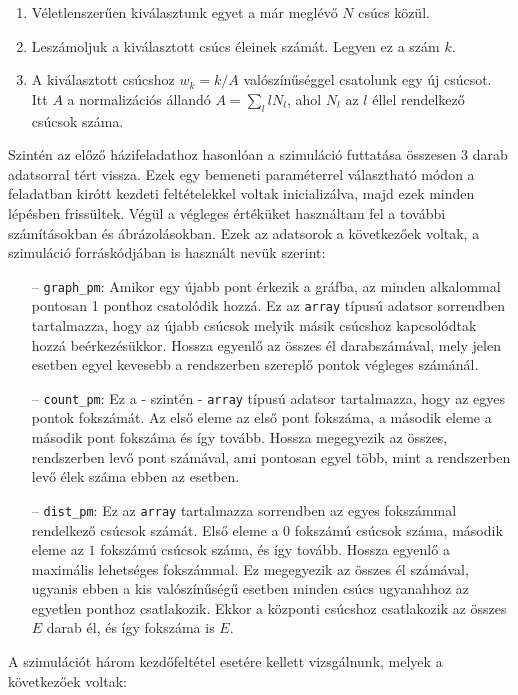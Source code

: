 \begin{enumerate}
    \item Véletlenszerűen kiválasztunk egyet a már meglévő $N$ csúcs közül.
    \item Leszámoljuk a kiválasztott csúcs éleinek számát. Legyen ez a szám $k$.
    \item A kiválasztott csúcshoz $w_{k} = k/A$ valószínűséggel csatolunk egy új csúcsot. Itt $A$ a normalizációs állandó $A = \sum_{l} l N_{l}$, ahol $N_{l}$ az $l$ éllel rendelkező csúcsok száma.
\end{enumerate}
Szintén az előző házifeladathoz hasonlóan a szimuláció futtatása összesen 3 darab adatsorral tért vissza. Ezek egy bemeneti paraméterrel választható módon a feladatban kirótt kezdeti feltételekkel voltak inicializálva, majd ezek minden lépésben frissültek. Végül a végleges értéküket használtam fel a további számításokban és ábrázolásokban. Ezek az adatsorok a következőek voltak, a szimuláció forráskódjában is használt nevük szerint:

\begin{itemize}
    \item[--] \texttt{graph\_pm}: Amikor egy újabb pont érkezik a gráfba, az minden alkalommal pontosan 1 ponthoz csatolódik hozzá. Ez az \texttt{array} típusú adatsor sorrendben tartalmazza, hogy az újabb csúcsok melyik másik csúcshoz kapcsolódtak hozzá beérkezésükkor. Hossza egyenlő az összes él darabszámával, mely jelen esetben egyel kevesebb a rendszerben szereplő pontok végleges számánál.
    \item[--] \texttt{count\_pm}: Ez a - szintén - \texttt{array} típusú adatsor tartalmazza, hogy az egyes pontok fokszámát. Az első eleme az első pont fokszáma, a második eleme a második pont fokszáma és így tovább. Hossza megegyezik az összes, rendszerben levő pont számával, ami pontosan egyel több, mint a rendszerben levő élek száma ebben az esetben.
    \item[--] \texttt{dist\_pm}: Ez az \texttt{array} tartalmazza sorrendben az egyes fokszámmal rendelkező csúcsok számát. Első eleme a $0$ fokszámú csúcsok száma, második eleme az $1$ fokszámú csúcsok száma, és így tovább. Hossza egyenlő a maximális lehetséges fokszámmal. Ez megegyezik az összes él számával, ugyanis ebben a kis valószínűségű esetben minden csúcs ugyanahhoz az egyetlen ponthoz csatlakozik. Ekkor a központi csúcshoz csatlakozik az összes $E$ darab él, és így fokszáma is $E$.
\end{itemize}

A szimulációt három kezdőfeltétel esetére kellett vizsgálnunk, melyek a következőek voltak:

